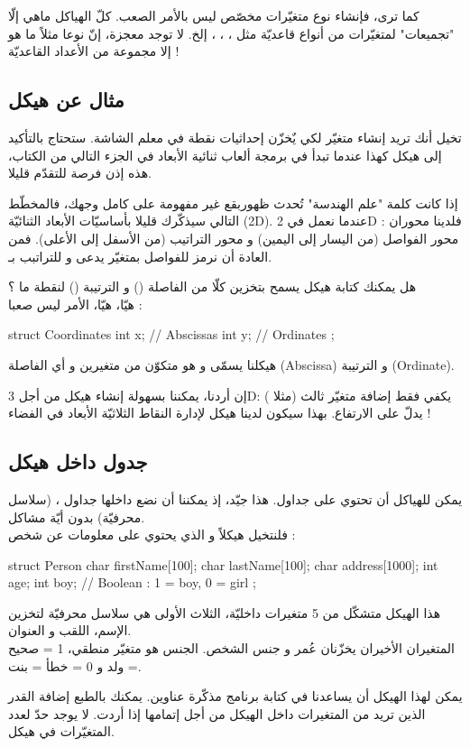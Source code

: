 كما ترى، فإنشاء نوع متغيّرات مخصّص ليس بالأمر الصعب. كلّ الهياكل ماهي إلّا "تجميعات" لمتغيّرات من أنواع قاعديّة مثل
، ، ،
إلخ. لا توجد معجزة، إنّ نوعا
مثلاً ما هو إلا مجموعة من الأعداد القاعديّة !

\subsection{مثال عن هيكل}
تخيل أنك تريد إنشاء متغيّر لكي يٌخزّن إحداثيات نقطة في معلم الشاشة. ستحتاج بالتأكيد إلى هيكل كهذا عندما تبدأ في برمجة ألعاب ثنائية الأبعاد في الجزء التالي من الكتاب، هذه إذن فرصة للتقدّم قليلا.

إذا كانت كلمة "علم الهندسة" تُحدث ظهوربقع غير مفهومة على كامل وجهك، فالمخطّط التالي سيذكّرك قليلا بأساسيّات الأبعاد الثنائيّة (\textenglish{2D}).
عندما نعمل في
\textenglish{2D}
فلدينا محوران : محور الفواصل (من اليسار إلى اليمين) و محور التراتيب (من الأسفل إلى الأعلى). فمن العادة أن نرمز للفواصل بمتغيّر يدعى
و للتراتبب بـ.

هل يمكنك كتابة هيكل
يسمح بتخزين كلّا من الفاصلة
()
و الترتيبة
()
لنقطة ما ؟\\
هيّا، هيّا، الأمر ليس صعبا :
\begin{Csource}
struct Coordinates
{
	int x; // Abscissas
	int y; // Ordinates
};
\end{Csource}
هيكلنا يسمّى
و هو متكوّن من متغيرين
و
أي الفاصلة
(\textenglish{Abscissa})
و الترتيبة
(\textenglish{Ordinate}).

إن أردنا، يمكننا بسهولة إنشاء هيكل
من أجل
\textenglish{3D}:
يكفي فقط إضافة متغيّر ثالث (مثلا
)
يدلّ على الارتفاع. بهذا سيكون لدينا هيكل لإدارة النقاط الثلاثيّة الأبعاد في الفضاء !

\subsection{جدول داخل هيكل}
يمكن للهياكل أن تحتوي على جداول. هذا جيّد، إذ يمكننا أن نضع داخلها جداول
،
(سلاسل محرفيّة) بدون أيّة مشاكل.\\
فلنتخيل هيكلاً
و الذي يحتوي على معلومات عن شخص :
\begin{Csource}
struct Person
{
	char firstName[100];
	char lastName[100];
	char address[1000];
	int age;
	int boy; // Boolean : 1 = boy, 0 = girl
};
\end{Csource}
هذا الهيكل متشكّل من 5 متغيرات داخليّة، الثلاث الأولى هي سلاسل محرفيّة لتخزين الإسم، اللقب و العنوان.\\
المتغيران الأخيران يخزّنان عُمر و جنس الشخص. الجنس هو متغيّر منطقي، 1 = صحيح = ولد و 0 = خطأ = بنت.

يمكن لهذا الهيكل أن يساعدنا في كتابة برنامج مذكّرة عناوين. يمكنك بالطبع إضافة القدر الذين تريد من المتغيرات داخل الهيكل من أجل إتمامها إذا أردت. لا يوجد حدّ لعدد المتغيّرات في هيكل.
